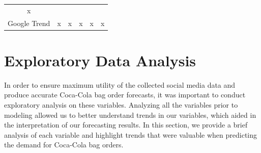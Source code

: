 \documentclass[12pt,oneside]{chicagocapstone}
\begin{document}
\begin{longtable}[]{@{}cccccc@{}}
\begin{minipage}[t]{0.12\columnwidth}
x\strut
\end{minipage}\tabularnewline
\begin{minipage}[t]{0.21\columnwidth}\centering
Google Trend\strut
\end{minipage} & \begin{minipage}[t]{0.11\columnwidth}\centering
x\strut
\end{minipage} & \begin{minipage}[t]{0.12\columnwidth}\centering
x\strut
\end{minipage} & \begin{minipage}[t]{0.14\columnwidth}\centering
x\strut
\end{minipage} & \begin{minipage}[t]{0.14\columnwidth}\centering
x\strut
\end{minipage} & \begin{minipage}[t]{0.12\columnwidth}\centering
x\strut
\end{minipage}\tabularnewline
\bottomrule
\end{longtable}
\hypertarget{methodology-descriptive}{%
\section*{Exploratory Data Analysis}\label{methodology-descriptive}}

In order to ensure maximum utility of the collected social media data and produce accurate Coca-Cola bag order forecasts, it was important to conduct exploratory analysis on these variables. Analyzing all the variables prior to modeling allowed us to better understand trends in our variables, which aided in the interpretation of our forecasting results. In this section, we provide a brief analysis of each variable and highlight trends that were valuable when predicting the demand for Coca-Cola bag orders.
\end{document}
